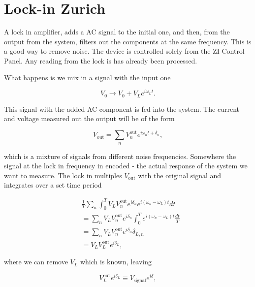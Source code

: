 \section{Lock-in Zurich}
A lock  in amplifier, adds a  AC signal to the  initial one, and then,  from the
output from the system, filters out  the components at the same frequency.  This
is a  good way to  remove noise.   The device is  controlled solely from  the ZI
Control Panel.  Any reading from the lock is has already been processed.

What happens is we mix in a signal with the input one

  \begin{equation}
    V_0 \rightarrow V_0+V_{L}e^{i\omega_{L}t}.
  \end{equation}

  \noindent This signal with the added AC  component is fed into the system. The
  current and voltage measured out the output will be of the form

  \begin{equation}
    V_{\text{out}} = \sum_{n}V_n^{\text{out}}e^{i\omega_n t+\delta_n},
  \end{equation}

  \noindent  which is  a mixture  of signals  from different  noise frequencies.
  Somewhere the signal at the lock in frequency in encoded - the actual response
  of the  system we want  to measure. The lock  in multiples $  V_{\text{out}} $
  with the original signal and integrates over a set time period

  \begin{equation}
    \begin{aligned}
      &    \frac{1}{T}\sum_n    \int_{0}^{T}V_{L}V^{\text{out}}_ne^{i\delta_n}e^{i(\omega_n    -
        \omega_{L})t}dt \\& =  \sum_n V_{L}V^{\text{out}}_ne^{i\delta_{n}}\int_{0}^{T}e^{i(\omega_n -
        \omega_{L})t}\frac{dt}{T}  \\&  = \sum_n  V_{L}V^{\text{out}}_ne^{i\delta_{n}}\delta_{L,n}
      \\& = V_{L}V^{\text{out}}_Le^{i\delta_L},
    \end{aligned}
  \end{equation}

  \noindent where we can remove $ V_L $ which is known, leaving

  \begin{equation}
    V_{L}^{\text{out}}e^{i\delta_L} \equiv V_{\text{signal}}e^{i\delta},
  \end{equation}

